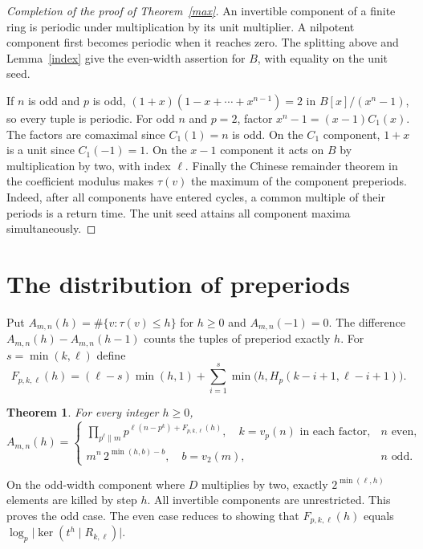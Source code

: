 \documentclass[11pt,letterpaper]{article}
\newtheorem{theorem}{Theorem}
\newcommand{\card}[1]{\lvert #1\rvert}
\newcommand{\A}{A_{m,n}}
\begin{document}
\begin{proof}[Completion of the proof of Theorem~\ref{max}]
An invertible component of a finite ring is periodic under multiplication
by its unit multiplier. A nilpotent component first becomes periodic when
it reaches zero. The splitting above and Lemma~\ref{index} give the
even-width assertion for $B$, with equality on the unit seed.

If $n$ is odd and $p$ is odd, $(1+x)(1-x+\cdots+x^{n-1})=2$ in
$B[x]/(x^n-1)$, so every tuple is periodic. For odd $n$ and $p=2$, factor
$x^n-1=(x-1)C_1(x)$. The factors are comaximal since $C_1(1)=n$ is odd.
On the $C_1$ component, $1+x$ is a unit since $C_1(-1)=1$.
On the $x-1$ component it acts on $B$ by multiplication by two, with index
$\ell$. Finally the Chinese remainder theorem in the coefficient modulus
makes $\tau(v)$ the maximum of the component preperiods. Indeed, after all
components have entered cycles, a common multiple of their periods is a
return time. The unit seed attains all component maxima simultaneously.
\end{proof}

\section{The distribution of preperiods}
Put $\A(h)=\#\{v:\tau(v)\le h\}$ for $h\ge0$ and $\A(-1)=0$.
The difference $\A(h)-\A(h-1)$ counts the tuples of preperiod exactly $h$.
For $s=\min(k,\ell)$ define
\begin{equation}\label{F}
 F_{p,k,\ell}(h)=(\ell-s)\min(h,1)+
 \sum_{i=1}^{s}\min\bigl(h,H_p(k-i+1,\ell-i+1)\bigr).
\end{equation}
\begin{theorem}\label{dist}
For every integer $h\ge0$,
\[
 \A(h)=
 \begin{cases}
 \displaystyle\prod_{p^\ell\parallel m}
 p^{\ell(n-p^{k})+F_{p,k,\ell}(h)},\quad k=v_p(n)\text{ in each factor},
       & n\text{ even},\\[3pt]
 m^n\,2^{\min(h,b)-b},\quad b=v_2(m),& n\text{ odd}.
 \end{cases}
\]
\end{theorem}
On the odd-width component where $D$ multiplies by two, exactly
$2^{\min(\ell,h)}$ elements are killed by step $h$. All invertible
components are unrestricted. This proves the odd case. The even case
reduces to showing that $F_{p,k,\ell}(h)$ equals
$\log_p\card{\ker(t^h\mid R_{k,\ell})}$.
\end{document}
